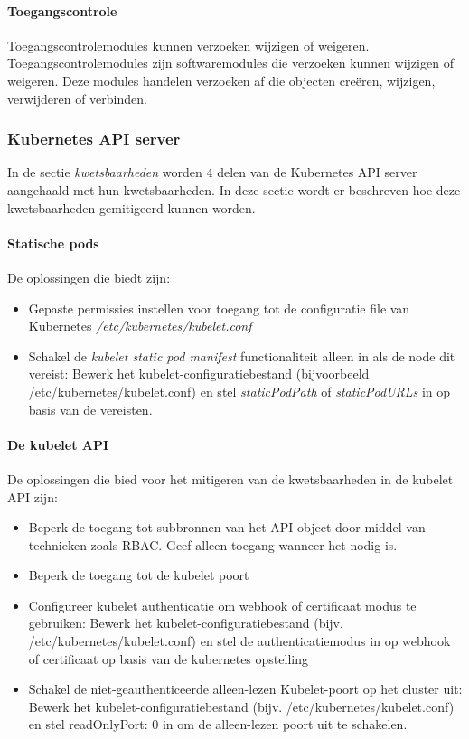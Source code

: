 \paragraph{Toegangscontrole}
Toegangscontrolemodules kunnen verzoeken wijzigen of weigeren. Toegangscontrolemodules zijn softwaremodules die verzoeken kunnen wijzigen of weigeren. Deze modules   handelen verzoeken af die objecten creëren, wijzigen, verwijderen of verbinden. 

\subsubsection{Kubernetes API server}
In de sectie \textit{kwetsbaarheden} worden 4 delen van de Kubernetes API server aangehaald met hun kwetsbaarheden. In deze sectie wordt er beschreven hoe deze kwetsbaarheden gemitigeerd kunnen worden.

\paragraph{Statische pods}
De oplossingen die \textcite{KubernetesDocs-2023} biedt zijn:
\begin{itemize}
    \item Gepaste permissies instellen voor toegang tot de configuratie file van Kubernetes \textit{/etc/kubernetes/kubelet.conf} 
    \item Schakel de \textit{kubelet static pod manifest} functionaliteit alleen in als de node dit vereist: Bewerk het kubelet-configuratiebestand (bijvoorbeeld /etc/kubernetes/kubelet.conf) en stel \textit{staticPodPath} of \textit{staticPodURLs} in op basis van de vereisten.
\end{itemize}

\paragraph{De kubelet API}
De oplossingen die \textcite{KubernetesDocs-2023} bied voor het mitigeren van de kwetsbaarheden in de kubelet API zijn:
\begin{itemize}
    \item Beperk de toegang tot subbronnen van het API object door middel van technieken zoals RBAC. Geef alleen toegang wanneer het nodig is.
    \item Beperk de toegang tot de kubelet poort
    \item Configureer kubelet authenticatie om webhook of certificaat modus te gebruiken: Bewerk het kubelet-configuratiebestand (bijv. /etc/kubernetes/kubelet.conf) en stel de authenticatiemodus in op webhook of certificaat op basis van de kubernetes opstelling
    \item Schakel de niet-geauthenticeerde alleen-lezen Kubelet-poort op het cluster uit: Bewerk het kubelet-configuratiebestand (bijv. /etc/kubernetes/kubelet.conf) en stel readOnlyPort: 0 in om de alleen-lezen poort uit te schakelen.
\end{itemize}

